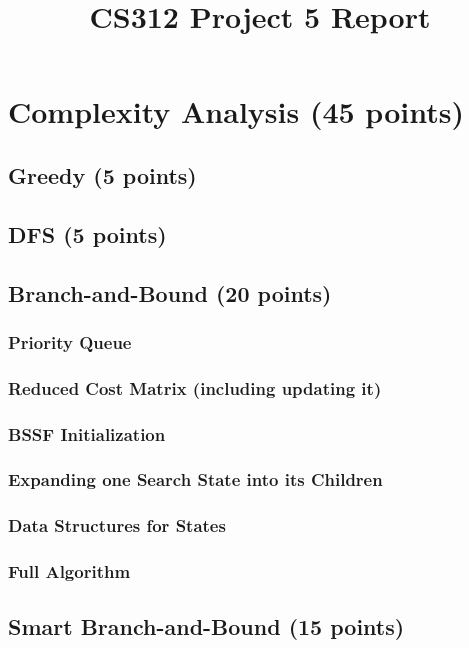 \documentclass[12pt]{article}
\title{CS312 Project 5 Report}
\author{}
\date{}
\begin{document}
\maketitle

\section*{Complexity Analysis (45 points)}

\subsection*{Greedy (5 points)}

\subsection*{DFS (5 points)}

\subsection*{Branch-and-Bound (20 points)}
\subsubsection*{Priority Queue}
\subsubsection*{Reduced Cost Matrix (including updating it)}
\subsubsection*{BSSF Initialization}
\subsubsection*{Expanding one Search State into its Children}
\subsubsection*{Data Structures for States}
\subsubsection*{Full Algorithm}

\subsection*{Smart Branch-and-Bound (15 points)}
\end{document}
